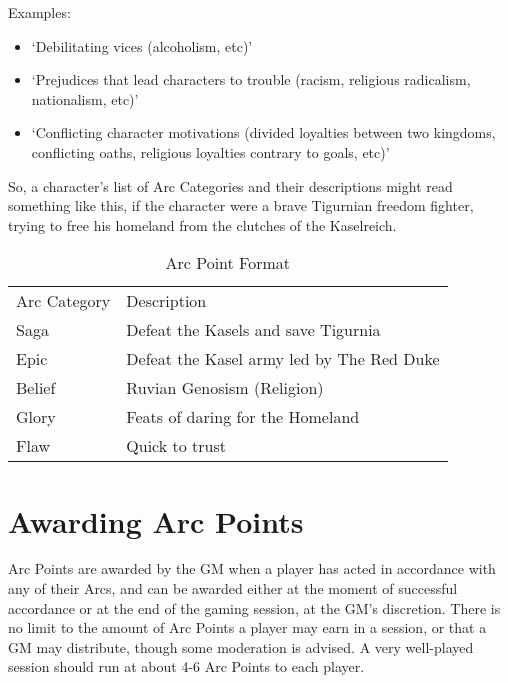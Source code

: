 \documentclass[oneside,11pt,english]{book}
\begin{document}
 
Examples: 
\begin{itemize}
\item ‘Debilitating vices (alcoholism, etc)’ 
\item ‘Prejudices that lead characters to trouble (racism, religious radicalism, nationalism, etc)’ 
\item ‘Conflicting character motivations (divided loyalties between two kingdoms, conflicting oaths, 
religious loyalties contrary to goals, etc)’ 
\end{itemize}
So, a character’s list of Arc Categories and their descriptions might read something like this, if the 
character were a brave Tigurnian freedom fighter, trying to free his homeland from the clutches of the 
Kaselreich. 
\begin{table}[!h]
	\caption{Arc Point Format}
	\label{tab:ArcPointFormat}
	\begin{tabu} spread 0pt{lX}
Arc Category & Description\\ 
Saga&Defeat the Kasels and save Tigurnia \\
Epic &Defeat the Kasel army led by The Red Duke \\
Belief&Ruvian Genosism (Religion) \\
Glory &Feats of daring for the Homeland \\
Flaw&Quick to trust \\
	\end{tabu}
\end{table}  

\section{Awarding Arc Points}

Arc Points are awarded by the GM when a player has acted in accordance with any of their Arcs, and can 
be awarded either at the moment of successful accordance or at the end of the gaming session, at the 
GM’s discretion. There is no limit to the amount of Arc Points a player may earn in a session, or that a 
GM may distribute, though some moderation is advised. A very well-played session should run at about 
4-6 Arc Points to each player. 
 
\end{document}
